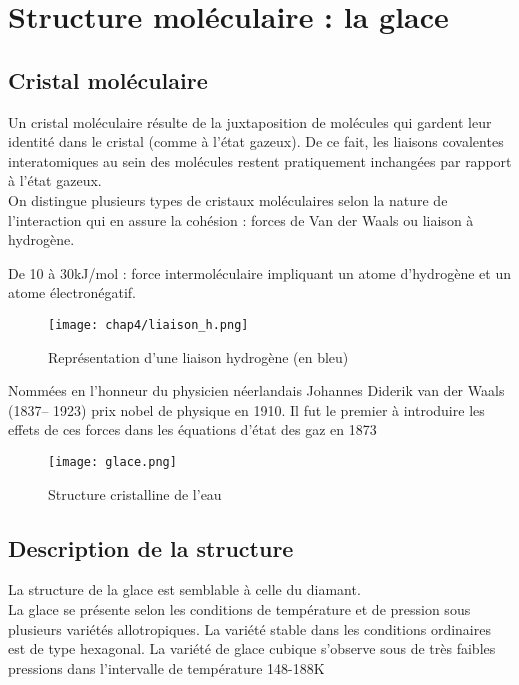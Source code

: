 \section{Structure moléculaire : la glace}
\subsection*{Cristal moléculaire}
Un cristal moléculaire résulte de la juxtaposition de molécules
qui gardent leur identité dans le cristal (comme à l'état gazeux).
De ce fait, les liaisons covalentes interatomiques au sein des
molécules restent pratiquement inchangées par rapport à l'état
gazeux.\\
On distingue plusieurs types de cristaux moléculaires selon la
nature de l'interaction qui en assure la cohésion :
forces de Van der Waals ou liaison à hydrogène.

\begin{rem}
    De 10 à 30kJ/mol : force intermoléculaire impliquant un
    atome d'hydrogène et un atome électronégatif.
\end{rem}
\begin{figure}
    \centering
    \texttt{[image: chap4/liaison\_h.png]}
    \caption[Liaison hydrogène]{Représentation d'une liaison
        hydrogène (en bleu)}\label{fig:4_liason_h}
\end{figure}
\begin{rem}
    Nommées en l'honneur du physicien néerlandais Johannes
    Diderik van der Waals (1837\--- 1923) prix nobel de
    physique en 1910. Il fut le premier à introduire les
    effets de ces forces dans les équations d'état des gaz
    en 1873
\end{rem}
\begin{figure}
    \centering
    \texttt{[image: glace.png]}
    \caption{Structure cristalline de l'eau}\label{fig:4_glace}
\end{figure}

\subsection{Description de la structure}
La structure de la glace est semblable à celle du diamant.\\
La glace se présente selon les conditions de température et
de pression sous plusieurs variétés allotropiques.
La variété stable dans les conditions ordinaires est
de type hexagonal. La variété de glace cubique s’observe
sous de très faibles pressions dans l’intervalle de
température 148\--188K


